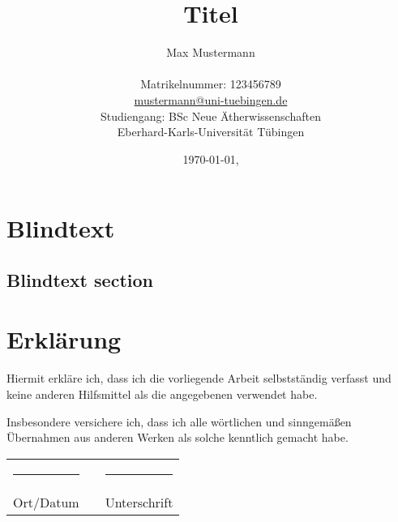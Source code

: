 \documentclass[
  11pt,
  bibliography=totoc,
  numbers=noenddot,
  ]{scrbook}
\title{Titel}
\author{{\LARGE Max Mustermann} \\
  \\
  Matrikelnummer: 123456789\\
  \url{mustermann@uni-tuebingen.de}\\ 
  Studiengang: BSc Neue Ätherwissenschaften \\
  Eberhard-Karls-Universität Tübingen\\}
\date{\ddmmyyyydate\today, \currenttime}
\begin{document}
\maketitle
\frontmatter
\tableofcontents
\mainmatter 



\chapter{Blindtext}

\lipsum

\section{Blindtext section}

\lipsum


\insertBib

\chapter*{Erklärung}

Hiermit erkläre ich, dass ich die vorliegende Arbeit selbstständig verfasst und keine anderen Hilfsmittel als die angegebenen verwendet habe.

Insbesondere versichere ich, dass ich alle wörtlichen und sinngemäßen Übernahmen aus anderen Werken als solche kenntlich gemacht habe.

\vspace{10ex}

\noindent
\begin{tabular}{lcl}
  \rule{6cm}{1pt} & \hspace{1cm} & \rule{6cm}{1pt} \\
  Ort/Datum & & Unterschrift
\end{tabular}
\end{document}
